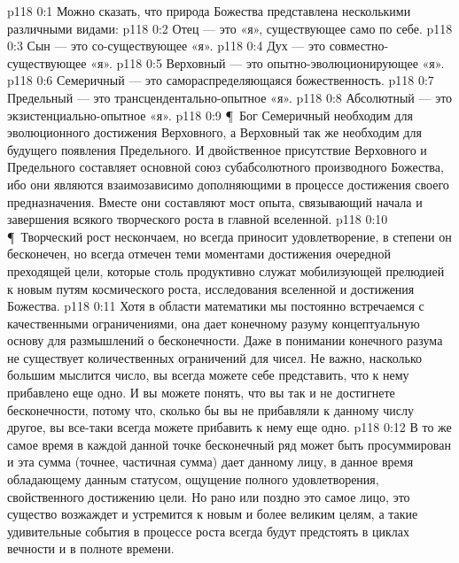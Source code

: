 \vs p118 0:1 Можно сказать, что природа Божества представлена несколькими различными видами:
\vs p118 0:2 \bibnobreakspace Отец --- это «я», существующее само по себе.
\vs p118 0:3 \bibnobreakspace Сын --- это со\hyp{}существующее «я».
\vs p118 0:4 \bibnobreakspace Дух --- это совместно\hyp{}существующее «я».
\vs p118 0:5 \bibnobreakspace Верховный --- это опытно\hyp{}эволюционирующее «я».
\vs p118 0:6 \bibnobreakspace Семеричный --- это самораспределяющаяся божественность.
\vs p118 0:7 \bibnobreakspace Предельный --- это трансцендентально\hyp{}опытное «я».
\vs p118 0:8 \bibnobreakspace Абсолютный --- это экзистенциально\hyp{}опытное «я».
\vs p118 0:9 \P\ Бог Семеричный необходим для эволюционного достижения Верховного, а Верховный так же необходим для будущего появления Предельного. И двойственное присутствие Верховного и Предельного составляет основной союз субабсолютного производного Божества, ибо они являются взаимозависимо дополняющими в процессе достижения своего предназначения. Вместе они составляют мост опыта, связывающий начала и завершения всякого творческого роста в главной вселенной.
\vs p118 0:10 \P\ Творческий рост нескончаем, но всегда приносит удовлетворение, в степени он бесконечен, но всегда отмечен теми моментами достижения очередной преходящей цели, которые столь продуктивно служат мобилизующей прелюдией к новым путям космического роста, исследования вселенной и достижения Божества.
\vs p118 0:11 Хотя в области математики мы постоянно встречаемся с качественными ограничениями, она дает конечному разуму концептуальную основу для размышлений о бесконечности. Даже в понимании конечного разума не существует количественных ограничений для чисел. Не важно, насколько большим мыслится число, вы всегда можете себе представить, что к нему прибавлено еще одно. И вы можете понять, что вы так и не достигнете бесконечности, потому что, сколько бы вы не прибавляли к данному числу другое, вы все\hyp{}таки всегда можете прибавить к нему еще одно.
\vs p118 0:12 В то же самое время в каждой данной точке бесконечный ряд может быть просуммирован и эта сумма (точнее, частичная сумма) дает данному лицу, в данное время обладающему данным статусом, ощущение полного удовлетворения, свойственного достижению цели. Но рано или поздно это самое лицо, это существо возжаждет и устремится к новым и более великим целям, а такие удивительные события в процессе роста всегда будут предстоять в циклах вечности и в полноте времени.
